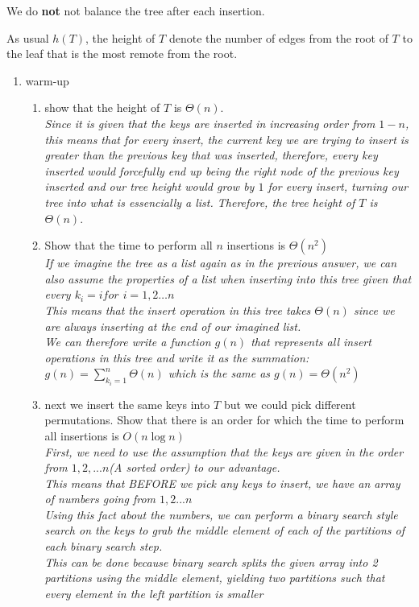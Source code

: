 \documentclass[11pt,epic,leqno,eepic,psfig,]{article}
\newcommand{\ans}[1]{{\color{brown}{\bf\Large Answer:} \sl  #1 \color{black}}}
\renewcommand{\i}{\item}
\begin{document}
\begin{enumerate}
We do {\bf not }not balance the tree after each insertion.

As usual $h(T)$,  the height of $T$  denote the number of edges from the root of $T$ to the leaf that is the most remote from the root.


\begin{enumerate}
\i warm-up
\begin{enumerate}
    \item show that the height of $T$ is $\Theta(n).$
\\\ans{Since it is given that the keys are inserted in increasing order from $1-n$, this means that for every insert, the current key we are trying to insert is greater than the previous key
	that was inserted, therefore, every key inserted would forcefully end up being the right node of the previous key inserted and our tree height would grow by $1$ for every insert,
	turning our tree into what is essencially a list. Therefore, the tree height of  $T$ is $\Theta(n).$}
    \i Show that the time to perform all $n$ insertions is $\Theta(n^2)$
\\\ans{If we imagine the tree as a list again as in the previous answer, we can also assume the properties of a list when inserting into this tree given that every $k_i = i for$ $i = 1, 2\dots n$
\\ This means that the insert operation in this tree takes $\Theta(n)$ since we are always inserting at the end of our imagined list.
\\ We can therefore write a function $g(n)$ that represents all insert operations in this tree and write it as the summation:
\\  $g(n)=\sum_{k_i=  1} ^n \Theta(n)$ which is the same as $g(n) = \Theta(n^2)$}
    \i next we insert the same keys into $T$ but we could pick different permutations.  Show that there is an order for which the time to perform all insertions is $O(n\log n)$
\\\ans{First, we need to use the assumption that the keys are given in the order from $1, 2, ... n$(A sorted order) to our advantage.
\\ This means that BEFORE we pick any keys to insert, we have an array of numbers going from $1, 2... n$
\\ Using this fact about the numbers, we can perform a binary search style search on the keys to grab the middle element of each of the partitions of each binary search step.
\\ This can be done because binary search splits the given array into 2 partitions using the middle element, yielding two partitions such that every element in the left partition is smaller
}
\end{enumerate}
\end{enumerate}
\end{enumerate}
\end{document}
